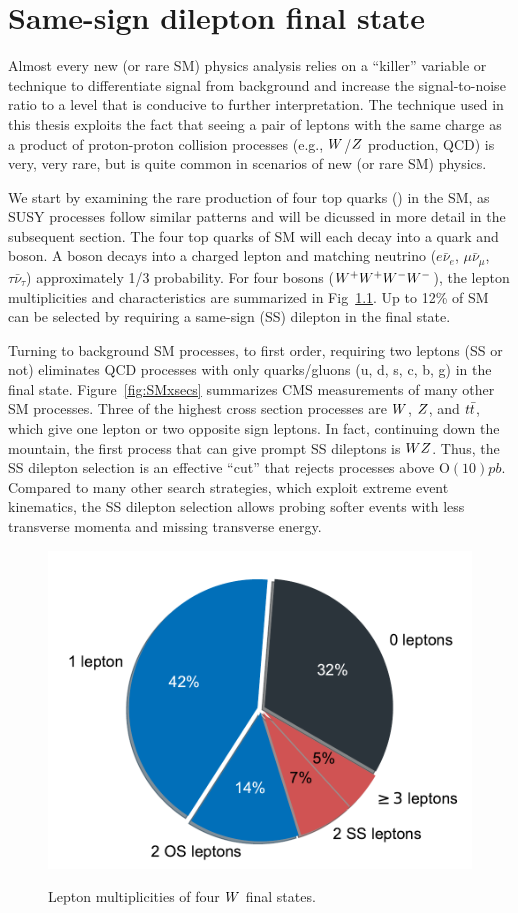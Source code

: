 \chapter{Same-sign dilepton final state}

Almost every new (or rare SM) physics analysis relies on a ``killer'' variable
or technique
to differentiate signal from background and increase the signal-to-noise
ratio to a level that is conducive to further interpretation.
The technique used in this thesis exploits the fact that seeing a pair of leptons
with the same charge as a product of proton-proton collision processes
(e.g., $W$/$Z$ production, QCD) is very, very rare,
but is quite common in scenarios of new (or rare SM) physics.

We start by examining the rare production of four top quarks (\tttt) in the SM,
as SUSY processes follow
similar patterns and will be dicussed in more detail in the subsequent section.
The four top quarks of SM \tttt will each decay into a \PQb quark and \PW boson.
A \PW boson decays into a charged lepton and matching neutrino 
($e\bar\nu_e$, $\mu\bar\nu_\mu$, $\tau\bar\nu_\tau$) approximately 1/3 probability.
For four \PW bosons ($W^+W^+W^-W^-$), the lepton multiplicities and characteristics are summarized in
Fig~\ref{fig:fourtoppie}. Up to 12\% of SM \tttt can be selected by requiring
a same-sign (SS) dilepton in the final state. 

Turning to background SM processes, to first order, requiring two leptons
(SS or not) eliminates QCD processes  with only quarks/gluons (u, d, s, c, b, g) in the final state.
Figure~\ref{fig:SMxsecs} summarizes
CMS measurements of many other SM processes.
Three of the highest cross section processes 
are $W$, $Z$, and $t\bar{t}$, which give one lepton or two opposite sign leptons.
In fact, continuing down the mountain, the first process that can give prompt
SS dileptons is $WZ$. Thus, the SS dilepton selection is an effective
``cut'' that rejects processes above $\mathrm{O}(10)\unit{pb}$. Compared to many other
search strategies, which exploit extreme event kinematics, the SS dilepton selection allows probing softer
events with less transverse momenta and missing transverse energy.




\begin{figure}[!hbtp]
\centering
\includegraphics[width=.50\textwidth]{figs/misc/fourtopdecay_pie.pdf} \\
\caption{Lepton multiplicities of four $W$ final states.}
\label{fig:fourtoppie}
\end{figure}

